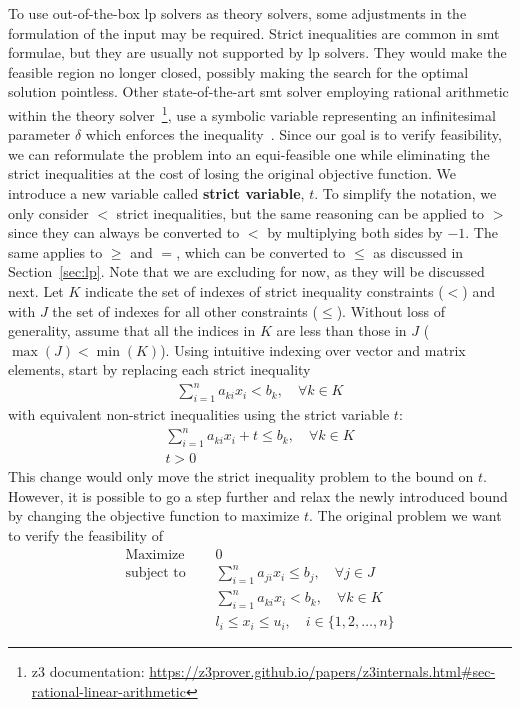 \documentclass[runningheads]{llncs}
\begin{document}
To use out-of-the-box \gls{lp} solvers as theory solvers, some adjustments in the formulation of the input may be required.
Strict inequalities are common in \gls{smt} formulae, but they are usually not supported by \gls{lp} solvers. They would make the feasible region no longer closed, possibly making the search for the optimal solution pointless.
Other state-of-the-art \gls{smt} solver employing rational arithmetic within the theory solver~\footnote{z3 documentation: \url{https://z3prover.github.io/papers/z3internals.html\#sec-rational-linear-arithmetic}}, use a symbolic variable representing an infinitesimal parameter $\delta$ which enforces the inequality~\cite{ref:lra-dpll-t}.
Since our goal is to verify feasibility, we can reformulate the problem into an equi-feasible one while eliminating the strict inequalities at the cost of losing the original objective function.
We introduce a new variable called \textbf{strict variable}, $t$.
To simplify the notation, we only consider $<$ strict inequalities, but the same reasoning can be applied to $>$ since they can always be converted to $<$ by multiplying both sides by $-1$.
The same applies to $\ge$ and $=$, which can be converted to $\le$ as discussed in Section~\ref{sec:lp}.
Note that we are excluding \nqcs for now, as they will be discussed next.
Let $K$ indicate the set of indexes of strict inequality constraints ($<$) and with $J$ the set of indexes for all other constraints ($\le$).
Without loss of generality, assume that all the indices in $K$ are less than those in $J$ ($\max(J) < \min(K)$).
Using intuitive indexing over vector and matrix elements, start by replacing each strict inequality
\begin{align*}
    \sum_{i=1}^{n} a_{ki}x_{i} < b_k, \quad \forall k \in K
\end{align*}
with equivalent non-strict inequalities using the strict variable $t$:
\begin{align*}
    \sum_{i=1}^{n} a_{ki}x_{i} + t \le b_k, \quad \forall k \in K \\
    t > 0
\end{align*}
This change would only move the strict inequality problem to the bound on $t$.
However, it is possible to go a step further and relax the newly introduced bound by changing the objective function to maximize $t$.
The original problem we want to verify the feasibility of
\begin{equation}
    \label{eq:lp-original}
    \begin{split}
        \text{Maximize }   \quad & 0                                                          \\
        \text{subject to } \quad & \sum_{i=1}^{n} a_{ji}x_{i} \le b_j,  \quad \forall j \in J \\
        \quad                    & \sum_{i=1}^{n} a_{ki}x_{i} < b_k,   \quad \forall k \in K  \\
        & l_i \le x_i \le u_i,  \quad i \in \{1, 2, \ldots, n\}
    \end{split}
\end{equation}
\end{document}
